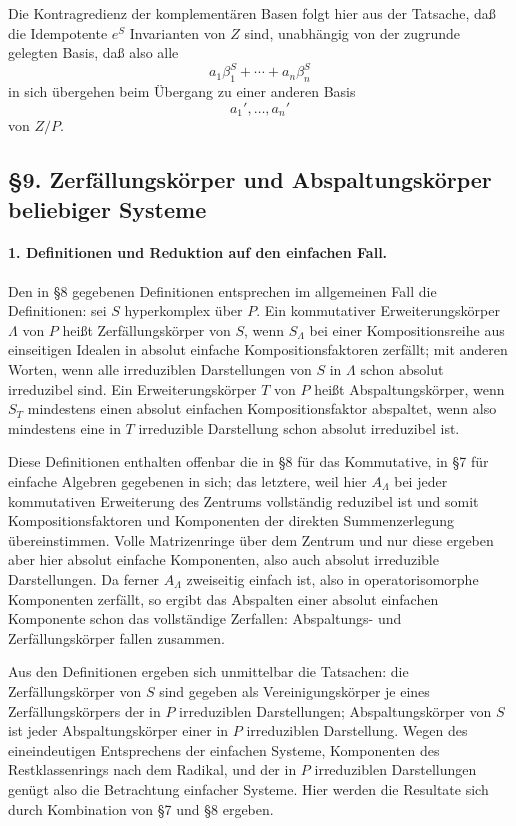 \documentclass[11pt]{article}
\begin{document}
Die Kontragredienz der komplementären Basen folgt hier aus der Tatsache, daß die Idempotente \(e^S\) Invarianten von \(Z\) sind, unabhängig von der zugrunde gelegten Basis, daß also alle
\[
        a_1\beta_1^S+\cdots+a_n\beta_n^S
\]
in sich übergehen beim Übergang zu einer anderen Basis
\[
        a_1',\ldots,a_n'
\]
von \(Z/P\).

\subsection*{§9. Zerfällungskörper und Abspaltungskörper beliebiger Systeme}

\paragraph{1. Definitionen und Reduktion auf den einfachen Fall.}
Den in §8 gegebenen Definitionen entsprechen im allgemeinen Fall die Definitionen: sei \(S\) hyperkomplex über \(P\). Ein kommutativer Erweiterungskörper \(\Lambda\) von \(P\) heißt Zerfällungskörper von \(S\), wenn \(S_\Lambda\) bei einer Kompositionsreihe aus einseitigen Idealen in absolut einfache Kompositionsfaktoren zerfällt; mit anderen Worten, wenn alle irreduziblen Darstellungen von \(S\) in \(\Lambda\) schon absolut irreduzibel sind. Ein Erweiterungskörper \(T\) von \(P\) heißt Abspaltungskörper, wenn \(S_T\) mindestens einen absolut einfachen Kompositionsfaktor abspaltet, wenn also mindestens eine in \(T\) irreduzible Darstellung schon absolut irreduzibel ist.

Diese Definitionen enthalten offenbar die in §8 für das Kommutative, in §7 für einfache Algebren gegebenen in sich; das letztere, weil hier \(A_\Lambda\) bei jeder kommutativen Erweiterung des Zentrums vollständig reduzibel ist und somit Kompositionsfaktoren und Komponenten der direkten Summenzerlegung übereinstimmen. Volle Matrizenringe über dem Zentrum und nur diese ergeben aber hier absolut einfache Komponenten, also auch absolut irreduzible Darstellungen. Da ferner \(A_\Lambda\) zweiseitig einfach ist, also in operatorisomorphe Komponenten zerfällt, so ergibt das Abspalten einer absolut einfachen Komponente schon das vollständige Zerfallen: Abspaltungs- und Zerfällungskörper fallen zusammen.

Aus den Definitionen ergeben sich unmittelbar die Tatsachen: die Zerfällungskörper von \(S\) sind gegeben als Vereinigungskörper je eines Zerfällungskörpers der in \(P\) irreduziblen Darstellungen; Abspaltungskörper von \(S\) ist jeder Abspaltungskörper einer in \(P\) irreduziblen Darstellung. Wegen des eineindeutigen Entsprechens der einfachen Systeme, Komponenten des Restklassenrings nach dem Radikal, und der in \(P\) irreduziblen Darstellungen genügt also die Betrachtung einfacher Systeme. Hier werden die Resultate sich durch Kombination von §7 und §8 ergeben.
\end{document}
